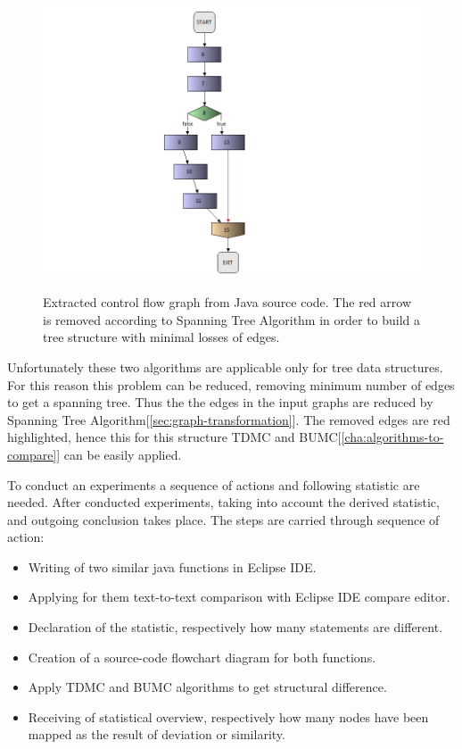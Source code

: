 \documentclass{report}
\begin{document}
\begin{figure}[h]
  \centering
  \includegraphics[scale = 0.5]{Figures/Java-flowchart-exp/control-flow-graph.png}\\[0.1cm]
  \caption[Extracted control flow graph from Java source code]{Extracted control flow graph from Java source code. The red arrow is removed according to Spanning Tree Algorithm in order to build a tree structure with minimal losses of edges. }
  \label{fig:control-flow-graph}
\end{figure}

Unfortunately these two algorithms are applicable only for tree data structures. For this reason this problem can be reduced, removing minimum number of edges to get a spanning tree. Thus the the edges in the input graphs are reduced by Spanning Tree Algorithm[\ref{sec:graph-transformation}]. The removed edges are red highlighted, hence this for this structure TDMC and BUMC[\ref{cha:algorithms-to-compare}] can be easily applied.

To conduct an experiments a sequence of actions and following statistic are needed. After conducted experiments, taking into account the derived statistic, and outgoing conclusion takes place. The steps are carried through sequence of action:
\begin{itemize}
	\item Writing of two similar java functions in Eclipse IDE.
	\item Applying for them text-to-text comparison with Eclipse IDE compare editor.
	\item Declaration of the statistic, respectively how many statements are different.
	\item Creation of a source-code flowchart diagram for both functions.
	\item Apply TDMC and BUMC algorithms to get structural difference.
	\item Receiving of statistical overview, respectively how many nodes have been  mapped as the result of deviation or similarity.
\end{itemize}
\end{document}
